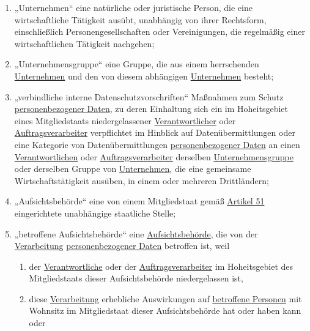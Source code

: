 \begin{enumerate}
  \item „Unternehmen“ eine natürliche oder juristische Person, die eine wirtschaftliche Tätigkeit ausübt, unabhängig von
   ihrer Rechtsform, einschließlich Personengesellschaften oder Vereinigungen, die regelmäßig einer wirtschaftlichen
   Tätigkeit nachgehen;%
  \label{itm:04-18}

  \item „Unternehmensgruppe“ eine Gruppe, die aus einem herrschenden \hyperref[itm:04-18]{Unternehmen} und den von
   diesem abhängigen
   \hyperref[itm:04-18]{Unternehmen} besteht;%
  \label{itm:04-19}

  \item „verbindliche interne Datenschutzvorschriften“ Maßnahmen zum Schutz \hyperref[itm:04-1]
   {personenbezogener Daten}, zu deren Einhaltung sich ein im Hoheitsgebiet eines Mitgliedstaats
   niedergelassener \hyperref[itm:04-7]{Verantwortlicher} oder \hyperref[itm:04-8]{Auftragsverarbeiter} verpflichtet im
   Hinblick auf Datenübermittlungen oder eine Kategorie von Datenübermittlungen \hyperref[itm:04-1]
   {personenbezogener Daten} an einen \hyperref[itm:04-7]{Verantwortlichen} oder \hyperref[itm:04-8]
   {Auftragsverarbeiter} derselben \hyperref[itm:04-19]{Unternehmensgruppe} oder derselben Gruppe von
   \hyperref[itm:04-18]{Unternehmen}, die eine gemeinsame Wirtschaftstätigkeit ausüben, in einem oder mehreren
    Drittländern;%
  \label{itm:04-20}

  \item „Aufsichtsbehörde“ eine von einem Mitgliedstaat gemäß \hyperref[ch:51]{Artikel 51} eingerichtete unabhängige
   staatliche Stelle;%
  \label{itm:04-21}   

  \item „betroffene Aufsichtsbehörde“ eine \hyperref[itm:04-21]{Aufsichtsbehörde}, die von der \hyperref[itm:04-2]
   {Verarbeitung} \hyperref[itm:04-1]{personenbezogener Daten} betroffen ist, weil%
  \label{itm:04-22}

  \begin{enumerate}

    \item der \hyperref[itm:04-7]{Verantwortliche} oder der \hyperref[itm:04-8]{Auftragsverarbeiter} im Hoheitsgebiet
     des Mitgliedstaats dieser Aufsichtsbehörde niedergelassen ist,%
    \label{itm:04-22a}

    \item diese \hyperref[itm:04-2]{Verarbeitung} erhebliche Auswirkungen auf \hyperref[itm:04-1]{betroffene Personen}
     mit Wohnsitz im Mitgliedstaat dieser Aufsichtsbehörde hat oder haben kann oder%
    \label{itm:04-22b}


\end{enumerate}
\end{enumerate}
